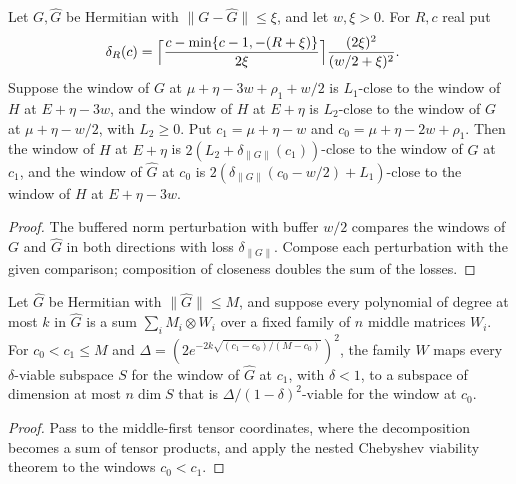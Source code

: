 \begin{lemma}
    \label{lem:soft_low_density_window_closeness}
    \leanok

    Let $G,\widehat G$ be Hermitian with $\|G-\widehat G\|\leq\xi$, and let
    $w,\xi>0$. For $R,c$ real put
    \begin{align}
        \delta_R(c) & =\Bigl\lceil\frac{c-\min\{c-1,-(R+\xi)\}}{2\xi}\Bigr\rceil
        \frac{(2\xi)^2}{(w/2+\xi)^2}.
    \end{align}
    Suppose the window of $G$ at $\mu+\eta-3w+\rho_1+w/2$ is $L_1$-close to
    the window of $H$ at $E+\eta-3w$, and the window of $H$ at $E+\eta$ is
    $L_2$-close to the window of $G$ at $\mu+\eta-w/2$, with $L_2\geq0$. Put
    $c_1=\mu+\eta-w$ and $c_0=\mu+\eta-2w+\rho_1$. Then the window of $H$ at
    $E+\eta$ is $2(L_2+\delta_{\|G\|}(c_1))$-close to the window of
    $\widehat G$ at $c_1$, and the window of $\widehat G$ at $c_0$ is
    $2(\delta_{\|G\|}(c_0-w/2)+L_1)$-close to the window of $H$ at
    $E+\eta-3w$.
\end{lemma}
\begin{proof}\leanok
    The buffered norm perturbation with buffer $w/2$ compares the windows of
    $G$ and $\widehat G$ in both directions with loss $\delta_{\|G\|}$.
    Compose each perturbation with the given comparison; composition of
    closeness doubles the sum of the losses.
\end{proof}

\begin{lemma}
    \label{lem:soft_low_density_chebyshev_viability}
    \leanok

    Let $\widehat G$ be Hermitian with $\|\widehat G\|\leq M$, and suppose
    every polynomial of degree at most $k$ in $\widehat G$ is a sum
    $\sum_iM_i\otimes W_i$ over a fixed family of $n$ middle matrices $W_i$.
    For $c_0<c_1\leq M$ and
    $\Delta=(2e^{-2k\sqrt{(c_1-c_0)/(M-c_0)}})^2$, the family $W$ maps every
    $\delta$-viable subspace $S$ for the window of $\widehat G$ at $c_1$,
    with $\delta<1$, to a subspace of dimension at most $n\dim S$ that is
    $\Delta/(1-\delta)^2$-viable for the window at $c_0$.
\end{lemma}
\begin{proof}\leanok
    Pass to the middle-first tensor coordinates, where the decomposition
    becomes a sum of tensor products, and apply the nested Chebyshev
    viability theorem to the windows $c_0<c_1$.
\end{proof}

